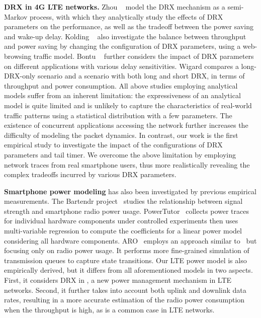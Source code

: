 \textbf{DRX in 4G LTE networks.} Zhou \etal~\cite{vtc.drx} model the DRX mechanism as a semi-Markov process, with which they analytically study the effects of DRX parameters on the performance, as well as the tradeoff between the power saving and wake-up delay. Kolding \etal~\cite{iswcs.lte} also investigate the balance between throughput and power saving by changing the configuration of DRX parameters, using a web-browsing traffic model. Bontu \etal~\cite{ieee.drx} further considers the impact of DRX parameters on different applications with various delay sensitivities. Wigard \etal compares a long-DRX-only scenario and a scenario with both long and short DRX, in terms of throughput and power consumption. All above studies employing analytical models suffer from an inherent limitation: the expressiveness of an analytical model is quite limited and is unlikely to capture the characteristics of real-world traffic patterns using a statistical distribution with a few parameters. The existence of concurrent applications accessing the network further increases the difficulty of modeling the packet dynamics. In contrast, our work is the first empirical study to investigate the impact of the configurations of DRX parameters and tail timer. We overcome the above limitation by employing network traces from real smartphone users, thus more realistically revealing the complex tradeoffs incurred by various DRX parameters.

\textbf{Smartphone power modeling} has also been investigated by previous empirical measurements. The Bartendr project~\cite{mobicom.bartendr} studies the relationship between signal strength and smartphone radio power usage. PowerTutor~\cite{codes.powertutor} collects power traces for individual hardware components under controlled experiments then uses multi-variable regression to compute the coefficients for a linear power model considering all hardware components. ARO~\cite{mobisys.aro} employs an approach similar to~\cite{codes.powertutor} but focusing only on radio power usage. It performs more fine-grained simulation of transmission queues to capture state transitions. Our LTE power model is also empirically derived, but it differs from all aforementioned models in two aspects. First, it considers DRX in \RC, a new power management mechanism in LTE networks. Second, it further takes into account both uplink and downlink data rates, resulting in a more accurate estimation of the radio power consumption when the throughput is high, as is a common case in LTE networks.


